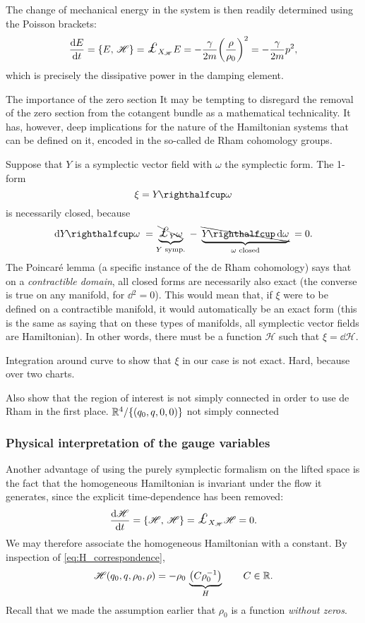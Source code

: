 The change of mechanical energy in the system is then readily determined using the Poisson brackets:
$$ \dv{E}{t} = \poisson{E}{\mathscr{H}} = \lied{X_\mathscr{H}}{E} = -\frac{\gamma}{2m}\qty(\frac{\rho}{\rho_0})^2 = -\frac{\gamma}{2m}p^2,$$
which is precisely the dissipative power in the damping element.


\begin{mathbox}{The importance of the zero section}
    It may be tempting to disregard the removal of the zero section from the cotangent bundle as a mathematical technicality. It has, however, deep implications for the nature of the Hamiltonian systems that can be defined on it, encoded in the so-called de Rham cohomology groups.
    
    Suppose that $Y$ is a symplectic vector field with $\omega$ the symplectic form. The 1-form
    $$\xi = \intpr{Y}{\omega}$$
    is necessarily closed, because
    $$ \dd{\intpr{Y}{\omega}} \; = \underbrace{\bcancel{\lied{Y}{\omega}}}_{Y \text{ symp.}}\;- \; \underbrace{\bcancel{\intpr{Y}{\dd{\omega}}}}_{\omega \text{ closed}}\; = 0. $$
    The Poincaré lemma (a specific instance of the de Rham cohomology) says that on a \emph{contractible domain}, all closed forms are necessarily also exact (the converse is true on any manifold, for $\dd{}^2 = 0$). This would mean that, if $\xi$ were to be defined on a contractible manifold, it would automatically be an exact form (this is the same as saying that on these types of manifolds, all symplectic vector fields are Hamiltonian). In other words, there must be a function $\mathscr{H}$ such that $\xi = \dd{\mathscr{H}}$.

    Integration around curve to show that $\xi$ in our case is not exact. Hard, because over two charts.

    Also show that the region of interest is not simply connected in order to use de Rham in the first place.
    $ \mathbb{R}^4 / \{(q_0, q, 0, 0)\} $ not simply connected
\end{mathbox}

\subsubsection{Physical interpretation of the gauge variables}
Another advantage of using the purely symplectic formalism on the lifted space is the fact that the homogeneous Hamiltonian is invariant under the flow it generates, since the explicit time-dependence has been removed:
$$ \dv{\mathscr{H}}{t} = \poisson{\mathscr{H}}{\mathscr{H}} = \lied{X_{\mathscr{H}}}{\mathscr{H}} = 0. $$
We may therefore associate the homogeneous Hamiltonian with a constant. By inspection of \cref{eq:H_correspondence}, 
$$ \mathscr{H}(q_0, q, \rho_0, \rho) = -\rho_0\,\underbrace{\qty(C\rho_0^{-1})}_{H} \qquad C \in \mathbb{R}.$$
Recall that we made the assumption earlier that $\rho_0$ is a function \emph{without zeros}. 

